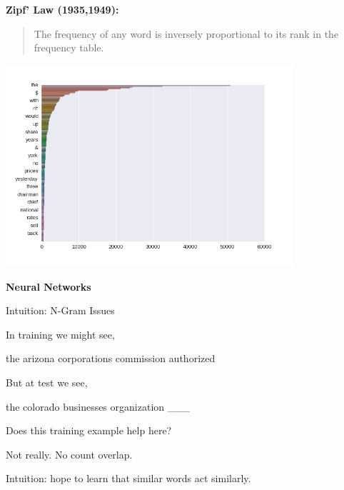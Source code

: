 \documentclass{beamer}
\let\tempone\itemize
\let\temptwo\enditemize
\renewenvironment{itemize}{\tempone\addtolength{\itemsep}{0.5\baselineskip}}{\temptwo}
\newcommand{\air}{\vspace{0.25cm}}
\begin{document}
\begin{frame}
  \textbf{Zipf' Law (1935,1949):}
  \begin{quote}
    The frequency of any word is inversely proportional to its rank in the frequency table.
  \end{quote}


     \begin{center}
       \includegraphics[width=0.8\textwidth]{zipf}         
     \end{center}
\end{frame}


\begin{frame}
  \begin{center}
    \textbf{Neural Networks}
  \end{center}
\end{frame}

\begin{frame}{Intuition: N-Gram Issues}
  
  In training we might see, 

  \begin{center}
    the arizona corporations commission \alert{authorized}
  \end{center}

  But at test we see, 
  \begin{center}
    the colorado businesses organization \alert{\_\_\_}
  \end{center}
  \pause 
  
  \begin{itemize}
  \item Does this training example help here?
    \begin{itemize}
    \item Not really. No count overlap.
    \end{itemize}
    \air 
    \pause 
  \item Intuition: hope to learn that similar words act similarly. 
  \end{itemize}
\end{frame}
\end{document}
